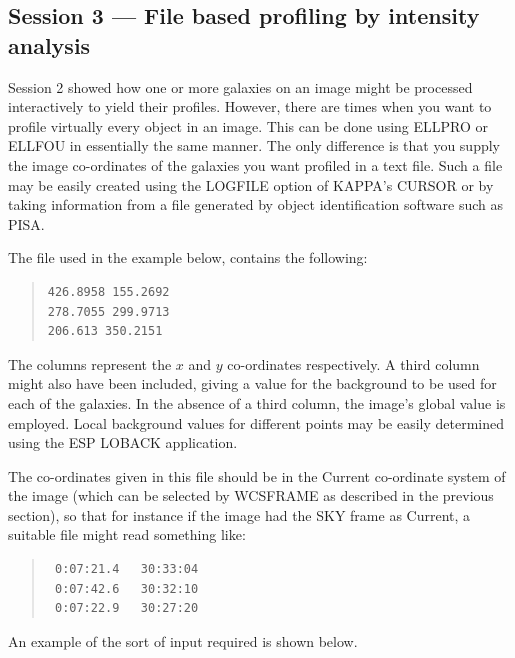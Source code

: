 \documentclass[twoside,11pt]{article}
\newcommand{\xref}[3]{#1}
\newcommand{\xlabel}[1]{}
\newenvironment{myquote}{\begin{quote}\begin{small}}{\end{small}\end{quote}}
\begin{document}
\subsection{Session 3 --- File based profiling by intensity analysis}
\xlabel{SESSION3}

Session 2 showed how one or more galaxies on an image might be 
processed interactively to yield their profiles. However, there are
times when you want to profile virtually every object in an image.
This can be done using ELLPRO or ELLFOU in essentially the same manner.
The only difference is that you supply the image co-ordinates of the galaxies
you want profiled in a text file. Such a file may be easily created 
using the LOGFILE option of \xref{KAPPA}{sun95}{}'s CURSOR or by taking 
information from a file generated by object identification software such as 
\xref{PISA}{sun109}{}.
 
The file used in the example below, contains the following:

\begin{myquote}
\begin{verbatim}
426.8958 155.2692
278.7055 299.9713
206.613 350.2151
\end{verbatim}
\end{myquote}

The columns represent the $x$ and $y$ co-ordinates respectively. A third column
might also have been included, giving a value for the background to be 
used for each of the galaxies. In the absence of a third column, the image's
global value is employed. Local background values for different points may be
easily determined using the ESP LOBACK application. 

The co-ordinates given in this file should be in the 
Current co-ordinate system of the image (which can be selected by
\xref{WCSFRAME}{sun95}{WCSFRAME} as described in the previous section),
so that for instance if the image had the SKY frame as Current,
a suitable file might read something like:

\begin{myquote}
\begin{verbatim}
 0:07:21.4   30:33:04
 0:07:42.6   30:32:10
 0:07:22.9   30:27:20
\end{verbatim}
\end{myquote}

An example of the sort of input required is shown below.
\end{document}
